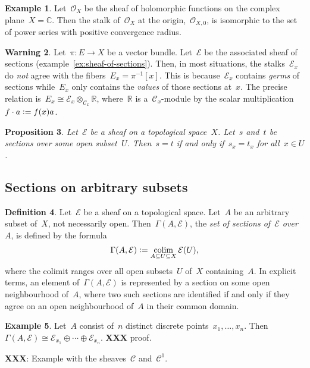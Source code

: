 \documentclass[10pt]{amsart}
\theoremstyle{definition}
\newtheorem{defn}{Definition}[section]
\newtheorem{ex}[defn]{Example}
\newtheorem{warning}[defn]{Warning}
\theoremstyle{plain}
\newtheorem{prop}[defn]{Proposition}
\theoremstyle{remark}
\newcommand{\C}{\mathcal{C}}
\newcommand{\E}{\mathcal{E}}
\renewcommand{\O}{\mathcal{O}}
\newcommand{\RR}{\mathbb{R}}
\newcommand{\CC}{\mathbb{C}}
\newcommand{\defeq}{\vcentcolon=}
\DeclareMathOperator{\colim}{colim}
\begin{document}
\begin{ex}Let~$\O_X$ be the sheaf of holomorphic functions on the complex
plane~$X = \CC$. Then the stalk of~$\O_X$ at the origin,~$\O_{X,0}$, is
isomorphic to the set of power series with positive convergence radius.\end{ex}

\begin{warning}Let~$\pi : E \to X$ be a vector bundle. Let~$\E$ be the
associated sheaf of sections (example~\ref{ex:sheaf-of-sections}). Then, in
most situations, the stalks~$\E_x$ do \emph{not} agree with the fibers~$E_x =
\pi^{-1}[x]$. This is because~$\E_x$ contains \emph{germs} of sections
while~$E_x$ only contains the \emph{values} of those sections at~$x$. The
precise relation is~$E_x \cong \E_x \otimes_{\C_x} \RR$, where~$\RR$ is
a~$\C_x$-module by the scalar multiplication~$f \cdot a \defeq f(x)a$.
\end{warning}

\begin{prop}Let~$\E$ be a sheaf on a topological space~$X$. Let~$s$ and~$t$ be
sections over some open subset~$U$. Then~$s = t$ if and only if~$s_x = t_x$ for
all~$x \in U$.\end{prop}


\subsection{Sections on arbitrary subsets}

\begin{defn}Let~$\E$ be a sheaf on a topological space. Let~$A$ be an arbitrary
subset of~$X$, not necessarily open. Then~$\Gamma(A,\E)$, the \emph{set of
sections of~$\E$ over~$A$}, is defined by the formula
\[ \Gamma(A,\E) \defeq \colim_{A \subseteq U \subseteq X} \E(U), \]
where the colimit ranges over all open subsets~$U$ of~$X$ containing~$A$.
In explicit terms, an element of~$\Gamma(A,\E)$ is represented by a section on
some open neighbourhood of~$A$, where two such sections are identified if and
only if they agree on an open neighbourhood of~$A$ in their common
domain.\end{defn}

\begin{ex}Let~$A$ consist of~$n$ distinct discrete points~$x_1,\ldots,x_n$.
Then~$\Gamma(A,\E) \cong \E_{x_1} \oplus \cdots \oplus \E_{x_n}$.
\textbf{XXX} proof.\end{ex}

\textbf{XXX}: Example with the sheaves~$\C$ and~$\C^1$.
\end{document}
